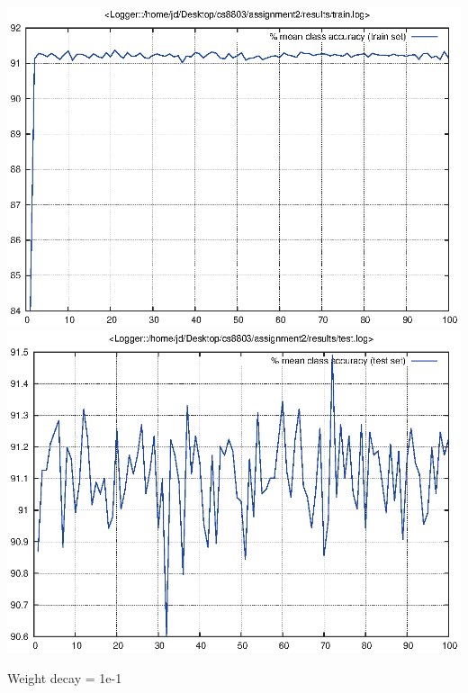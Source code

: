\documentclass[twoside,12pt]{article}
\newcommand{\imsize}{0.5\linewidth}
\begin{document}
\includegraphics[width=\imsize]{assignment2/results/sgdw_w3_train}
\includegraphics[width=\imsize]{assignment2/results/sgdw_w3_test}

Weight decay = 1e-1
\end{document}

